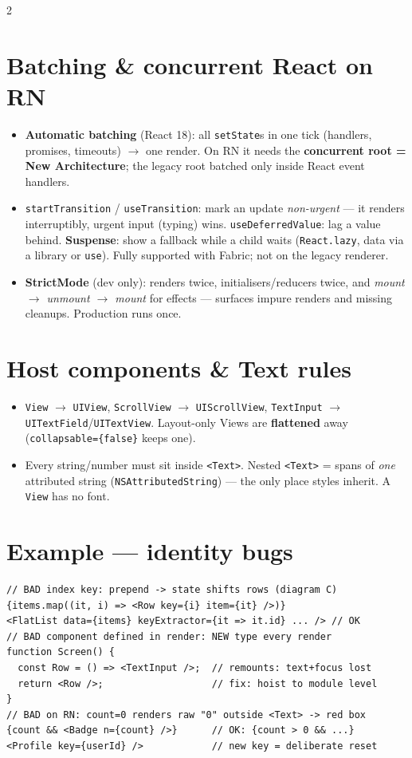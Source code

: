 \documentclass[8pt]{extarticle}
\begin{document}
\begin{multicols}{2}
\section{Batching \& concurrent React on RN}
\begin{itemize}
  \item \textbf{Automatic batching} (React 18): all \texttt{setState}s in one tick
        (handlers, promises, timeouts) $\to$ one render. On RN it needs the
        \textbf{concurrent root = New Architecture}; the legacy root batched only
        inside React event handlers.
  \item \texttt{startTransition} / \texttt{useTransition}: mark an update
        \emph{non-urgent} — it renders interruptibly, urgent input (typing) wins.
        \texttt{useDeferredValue}: lag a value behind. \textbf{Suspense}: show a
        fallback while a child waits (\texttt{React.lazy}, data via a library or
        \texttt{use}). Fully supported with Fabric; not on the legacy renderer.
  \item \textbf{StrictMode} (dev only): renders twice, initialisers/reducers twice, and
        \emph{mount $\to$ unmount $\to$ mount} for effects — surfaces impure renders and
        missing cleanups. Production runs once.
\end{itemize}

\columnbreak

\section{Host components \& Text rules}
\begin{itemize}
  \item \texttt{View} $\to$ \texttt{UIView}, \texttt{ScrollView} $\to$
        \texttt{UIScrollView}, \texttt{TextInput} $\to$ \texttt{UITextField}/\texttt{UITextView}.
        Layout-only Views are \textbf{flattened} away (\texttt{collapsable=\{false\}} keeps one).
  \item Every string/number must sit inside \texttt{<Text>}. Nested \texttt{<Text>}
        = spans of \emph{one} attributed string (\texttt{NSAttributedString}) — the only
        place styles inherit. A \texttt{View} has no font.
\end{itemize}

\section{Example — identity bugs}
\begin{lstlisting}[language=TSSheet]
// BAD index key: prepend -> state shifts rows (diagram C)
{items.map((it, i) => <Row key={i} item={it} />)}
<FlatList data={items} keyExtractor={it => it.id} ... /> // OK
// BAD component defined in render: NEW type every render
function Screen() {
  const Row = () => <TextInput />;  // remounts: text+focus lost
  return <Row />;                   // fix: hoist to module level
}
// BAD on RN: count=0 renders raw "0" outside <Text> -> red box
{count && <Badge n={count} />}      // OK: {count > 0 && ...}
<Profile key={userId} />            // new key = deliberate reset
\end{lstlisting}


\end{multicols}
\end{document}
